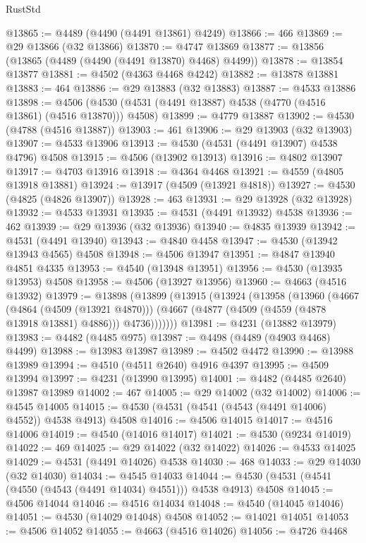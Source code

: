 \begin{lexlean}{RustStd}
\begin{coremodule}
@13865 := @4489 (@4490 (@4491 @13861) @4249)
@13866 := 466
@13869 := @29 @13866 (@32 @13866)
@13870 := @4747 @13869
@13877 := @13856 (@13865 (@4489 (@4490 (@4491 @13870) @4468) @4499))
@13878 := @13854 @13877
@13881 := @4502 (@4363 @4468 @4242)
@13882 := @13878 @13881
@13883 := 464
@13886 := @29 @13883 (@32 @13883)
@13887 := @4533 @13886
@13898 := @4506 (@4530 (@4531 (@4491 @13887) @4538 (@4770 (@4516 @13861) (@4516 @13870))) @4508)
@13899 := @4779 @13887
@13902 := @4530 (@4788 (@4516 @13887))
@13903 := 461
@13906 := @29 @13903 (@32 @13903)
@13907 := @4533 @13906
@13913 := @4530 (@4531 (@4491 @13907) @4538 @4796) @4508
@13915 := @4506 (@13902 @13913)
@13916 := @4802 @13907
@13917 := @4703 @13916
@13918 := @4364 @4468
@13921 := @4559 (@4805 @13918 @13881)
@13924 := @13917 (@4509 (@13921 @4818))
@13927 := @4530 (@4825 (@4826 @13907))
@13928 := 463
@13931 := @29 @13928 (@32 @13928)
@13932 := @4533 @13931
@13935 := @4531 (@4491 @13932) @4538
@13936 := 462
@13939 := @29 @13936 (@32 @13936)
@13940 := @4835 @13939
@13942 := @4531 (@4491 @13940)
@13943 := @4840 @4458
@13947 := @4530 (@13942 @13943 @4565) @4508
@13948 := @4506 @13947
@13951 := @4847 @13940 @4851 @4335
@13953 := @4540 (@13948 @13951)
@13956 := @4530 (@13935 @13953) @4508
@13958 := @4506 (@13927 @13956)
@13960 := @4663 (@4516 @13932)
@13979 := @13898
    (@13899
      (@13915
        (@13924
          (@13958
            (@13960
              (@4667
                (@4864 (@4509 (@13921 @4870)))
                (@4667 (@4877 (@4509 (@4559 (@4878 @13918 @13881) @4886))) @4736)))))))
@13981 := @4231 (@13882 @13979)
@13983 := @4482 (@4485 @975)
@13987 := @4498 (@4489 (@4903 @4468) @4499)
@13988 := @13983 @13987
@13989 := @4502 @4472
@13990 := @13988 @13989
@13994 := @4510 (@4511 @2640) @4916 @4397
@13995 := @4509 @13994
@13997 := @4231 (@13990 @13995)
@14001 := @4482 (@4485 @2640) @13987 @13989
@14002 := 467
@14005 := @29 @14002 (@32 @14002)
@14006 := @4545 @14005
@14015 := @4530 (@4531 (@4541 (@4543 (@4491 @14006) @4552)) @4538 @4913) @4508
@14016 := @4506 @14015
@14017 := @4516 @14006
@14019 := @4540 (@14016 @14017)
@14021 := @4530 (@9234 @14019)
@14022 := 469
@14025 := @29 @14022 (@32 @14022)
@14026 := @4533 @14025
@14029 := @4531 (@4491 @14026) @4538
@14030 := 468
@14033 := @29 @14030 (@32 @14030)
@14034 := @4545 @14033
@14044 := @4530 (@4531 (@4541 (@4550 (@4543 (@4491 @14034) @4551))) @4538 @4913) @4508
@14045 := @4506 @14044
@14046 := @4516 @14034
@14048 := @4540 (@14045 @14046)
@14051 := @4530 (@14029 @14048) @4508
@14052 := @14021 @14051
@14053 := @4506 @14052
@14055 := @4663 (@4516 @14026)
@14056 := @4726 @4468

\end{coremodule}
\end{lexlean}
